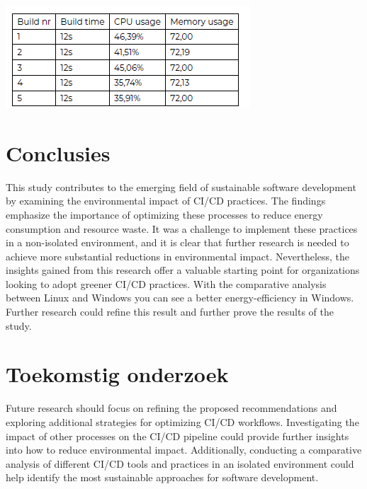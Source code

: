 \documentclass[a0,portrait]{hogent-poster}
\begin{document}
\begin{multicols}{2}
\begin{center}
  \captionsetup{type=figure}
  \includegraphics[width=1.0\linewidth]{./bachproef/graphics/Data_comparison.png}
\end{center}


\section{Conclusies}
This study contributes to the emerging field of sustainable software development by examining the environmental impact of CI/CD practices. The findings emphasize the importance of optimizing these processes to reduce energy consumption and resource waste. It was a challenge to implement these practices in a non-isolated environment, and it is clear that further research is needed to achieve more substantial reductions in environmental impact. Nevertheless, the insights gained from this research offer a valuable starting point for organizations looking to adopt greener CI/CD practices. With the comparative analysis between Linux and Windows you can see a better energy-efficiency in Windows. Further research could refine this result and further prove the results of the study.

\section{Toekomstig onderzoek}
Future research should focus on refining the proposed recommendations and exploring additional strategies for optimizing CI/CD workflows. Investigating the impact of other processes on the CI/CD pipeline could provide further insights into how to reduce environmental impact. Additionally, conducting a comparative analysis of different CI/CD tools and practices in an isolated environment could help identify the most sustainable approaches for software development.


\end{multicols}
\end{document}
